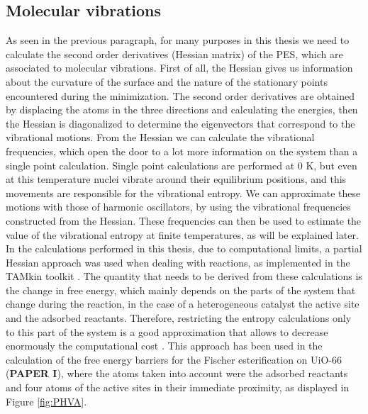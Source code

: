 \subsection*{Molecular vibrations}
As seen in the previous paragraph, for many purposes in this thesis we need to calculate the second order derivatives (Hessian matrix) of the PES, which are associated to molecular vibrations. First of all, the Hessian gives us information about the curvature of the surface and the nature of the stationary points encountered during the minimization. The second order derivatives are obtained by displacing the atoms in the three directions and calculating the energies, then the Hessian is diagonalized to determine the eigenvectors that correspond to the vibrational motions. 
From the Hessian we can calculate the vibrational frequencies, which open the door to a lot more information on the system than a single point calculation. Single point calculations are performed at 0 K, but even at this temperature nuclei vibrate around their equilibrium positions, and this movements are responsible for the vibrational entropy. We can approximate these motions with those of harmonic oscillators, by using the vibrational frequencies constructed from the Hessian. These frequencies can then be used to estimate the value of the vibrational entropy at finite temperatures, as will be explained later. In the calculations performed in this thesis, due to computational limits, a partial Hessian approach was used when dealing with reactions, as implemented in the TAMkin toolkit \cite{Ghysels2010}. The quantity that needs to be derived from these calculations is the change in free energy, which mainly depends on the parts of the system that change during the reaction, in the case of a heterogeneous catalyst the active site and the adsorbed reactants. Therefore, restricting the entropy calculations only to this part of the system is a good approximation that allows to decrease enormously the computational cost \cite{Ghysels2007}. This approach has been used in the calculation of the free energy barriers for the Fischer esterification on UiO-66 (\textbf{PAPER I}), where the atoms taken into account were the adsorbed reactants and four atoms of the active sites in their immediate proximity, as displayed in Figure \ref{fig:PHVA}.


